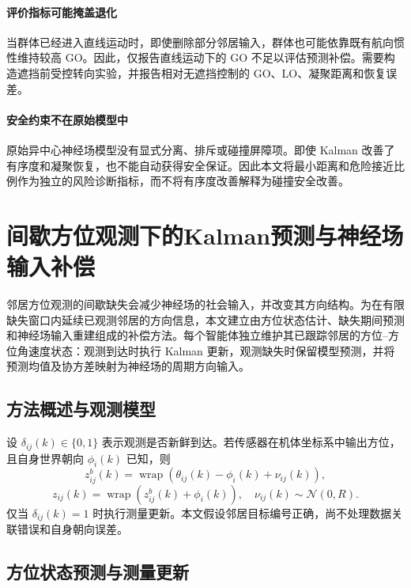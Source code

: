 \documentclass[UTF8,fontset=windows,11pt]{ctexart}
\begin{document}
\paragraph{评价指标可能掩盖退化}
当群体已经进入直线运动时，即使删除部分邻居输入，群体也可能依靠既有航向惯性维持较高 GO。因此，仅报告直线运动下的 GO 不足以评估预测补偿。需要构造遮挡前受控转向实验，并报告相对无遮挡控制的 GO、LO、凝聚距离和恢复误差。

\paragraph{安全约束不在原始模型中}
原始异中心神经场模型没有显式分离、排斥或碰撞屏障项。即使 Kalman 改善了有序度和凝聚恢复，也不能自动获得安全保证。因此本文将最小距离和危险接近比例作为独立的风险诊断指标，而不将有序度改善解释为碰撞安全改善。

\section{间歇方位观测下的Kalman预测与神经场输入补偿}

邻居方位观测的间歇缺失会减少神经场的社会输入，并改变其方向结构。为在有限缺失窗口内延续已观测邻居的方向信息，本文建立由方位状态估计、缺失期间预测和神经场输入重建组成的补偿方法。每个智能体独立维护其已跟踪邻居的方位--方位角速度状态：观测到达时执行 Kalman 更新，观测缺失时保留模型预测，并将预测均值及协方差映射为神经场的周期方向输入。

\subsection{方法概述与观测模型}
设 $\delta_{ij}(k)\in\{0,1\}$ 表示观测是否新鲜到达。若传感器在机体坐标系中输出方位，且自身世界朝向 $\phi_i(k)$ 已知，则
\begin{equation}
 z^b_{ij}(k)=\operatorname{wrap}(\theta_{ij}(k)-\phi_i(k)+\nu_{ij}(k)),
\end{equation}
\begin{equation}
 z_{ij}(k)=\operatorname{wrap}(z^b_{ij}(k)+\phi_i(k)),
 \quad \nu_{ij}(k)\sim\mathcal N(0,R).
\end{equation}
仅当 $\delta_{ij}(k)=1$ 时执行测量更新。本文假设邻居目标编号正确，尚不处理数据关联错误和自身朝向误差。

\subsection{方位状态预测与测量更新}
\end{document}
